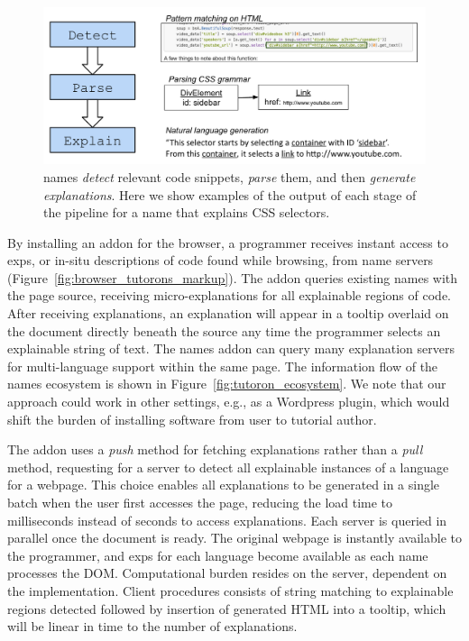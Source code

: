 \begin{figure}
\centering
    \includegraphics[width=\columnwidth]{figures/explanation_pipeline}
    \caption{\Glspl{name} \emph{detect} relevant code snippets, \emph{parse} them, and then \emph{generate explanations}.  Here we show examples of the output of each stage of the pipeline for a \gls{name} that explains CSS selectors.}\label{fig:explanation_pipeline}
\end{figure}
\fi

By installing an addon for the browser, a programmer receives instant access to \glspl{exp}, or in-situ descriptions of code found while browsing, from \gls{name} servers (Figure~\ref{fig:browser_tutorons_markup}).
The addon queries existing \glspl{name} with the page source, receiving micro-explanations for all explainable regions of code.
After receiving explanations, an explanation will appear in a tooltip overlaid on the document directly beneath the source any time the programmer selects an explainable string of text.
The \Glspl{name} addon can query many explanation servers for multi-language support within the same page.
The information flow of the \Glspl{name} ecosystem is shown in Figure~\ref{fig:tutoron_ecosystem}.
We note that our approach could work in other settings, e.g., as a Wordpress plugin, which would shift the burden of installing software from user to tutorial author.

The addon uses a \emph{push} method for fetching explanations rather than a \emph{pull} method, requesting for a server to detect all explainable instances of a language for a webpage.
This choice enables all explanations to be generated in a single batch when the user first accesses the page, reducing the load time to milliseconds instead of seconds to access explanations.
Each server is queried in parallel once the document is ready.
The original webpage is instantly available to the programmer, and \glspl{exp} for each language become available as each \gls{name} processes the DOM\@.
Computational burden resides on the server, dependent on the implementation.
Client procedures consists of string matching to explainable regions detected followed by insertion of generated HTML into a tooltip, which will be linear in time to the number of explanations.

